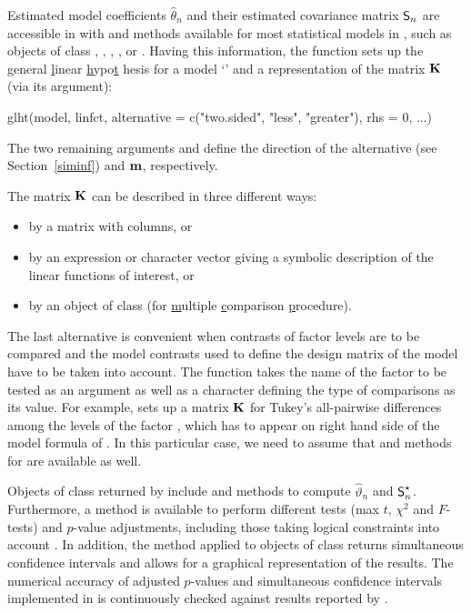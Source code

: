 \documentclass[12pt,a4paper]{article}
\begin{document}
Estimated model coefficients $\hat{\theta}_n$ and their estimated covariance matrix $%
\Sraw$ are accessible in \RR{} with  and 
methods available for most statistical models in \RR, such as objects of
class , , , ,  or %
. Having this information, the  function sets
up the \underline{g}eneral \underline{l}inear \underline{h}ypo\underline{t}%
hesis for a model `' and a representation of the matrix $\mathbf{K}$
(via its  argument): 
\begin{Sinput}
glht(model, linfct, alternative = c("two.sided", "less", "greater"),
     rhs = 0, ...)
\end{Sinput}
The two remaining arguments  and  define the
direction of the alternative (see Section~\ref{siminf}) and $\mathbf{m}$,
respectively.

The matrix $\mathbf{K}$ can be described in three different ways:

\begin{itemize}
\item by a matrix with  columns, or

\item by an expression or character vector giving a symbolic description  of
the linear functions of interest, or

\item by an object of class   (for \underline{m}ultiple 
\underline{c}omparison \underline{p}rocedure).
\end{itemize}

The last alternative is convenient when contrasts of factor levels are to be
compared and the model contrasts used to define the design matrix of the
model have to be taken into account. The  function takes the
name of the factor to be tested as an argument as well as a character
defining the type of comparisons as its value. For example,  sets up a matrix $\mathbf{K}$ for Tukey's all-pairwise differences among
the levels of the factor , which has to appear on right hand
side of the model formula of . In this particular case, we
need to assume that  and  methods
for  are available as well.

Objects of class  returned by  include %
 and  methods to compute $\hat{\vartheta}_n$ and $%
\SK$. Furthermore, a  method is available to perform
different tests (max $t$, $\chi^2$ and $F$-tests) and $p$-value adjustments,
including those taking logical constraints into account \citep{Shaffer1986,
Westfall1997}. In addition, the  method applied to objects
of class  returns simultaneous confidence intervals and allows
for a graphical representation of the results. The numerical accuracy of
adjusted $p$-values and simultaneous confidence intervals implemented in %
 is continuously checked against results reported by \cite%
{Westfall1999}.
\end{document}
